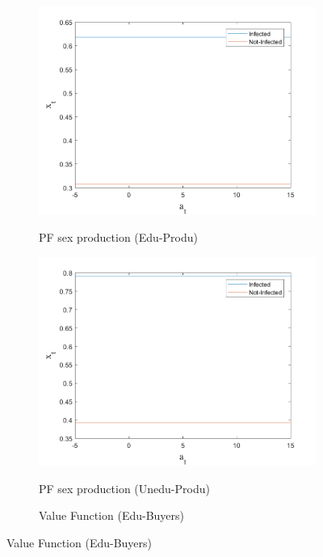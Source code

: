 \begin{figure}[H]
\bigskip
\begin{subfigure}{0.5\textwidth}\caption{PF sex production (Edu-Produ)}
   \includegraphics[width=\linewidth,height = 0.22\textheight]{figures/mio/FIG11.png}
    \label{fig_dert}
\end{subfigure}
\hspace*{\fill}
\begin{subfigure}{0.5\textwidth}\caption{PF sex production (Unedu-Produ)}
   \includegraphics[width=\linewidth,height = 0.22\textheight]{figures/mio/FIG12.png}
    \label{fig:x_b}
\end{subfigure}
\bigskip
\begin{subfigure}{0.5\textwidth}\caption{Value Function (Edu-Buyers)}

\end{subfigure}
\end{figure}
